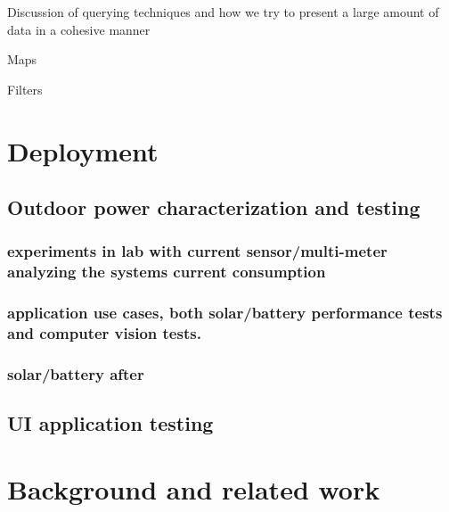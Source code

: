 \documentclass[10pt,conference]{IEEEtran}
\begin{document}
Discussion of querying techniques and how we try to present a large amount of data in a cohesive manner

Maps

Filters



 
 
 
\section{Deployment} 
	\subsection{ Outdoor power characterization and testing}
    	\subsubsection{experiments in lab with current sensor/multi-meter analyzing the systems current consumption}
		
        \subsubsection{application use cases, both solar/battery performance tests and computer vision tests.}
        
		\subsubsection{solar/battery after}
        
    \subsection{ UI application testing}
    
    
    



\section{Background and related work}



\end{document}
